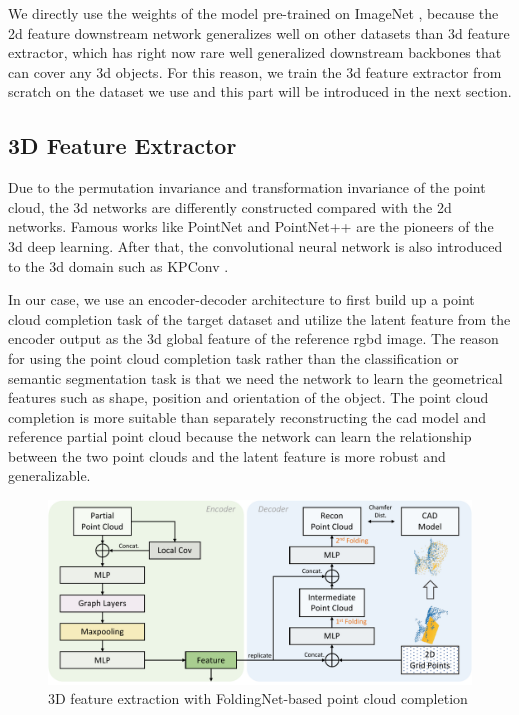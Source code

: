 \documentclass[12pt,DIV14,BCOR12mm,a4paper,footinclude=false,headinclude,parskip=half-,twoside,openright,cleardoublepage=empty,toc=index,bibliography=totoc,listof=totoc]{scrreprt}
\numberwithin{equation}{chapter}
\begin{document}
We directly use the weights of the model pre-trained on ImageNet \cite{5206848}, because the \gls{2d} feature downstream network generalizes well on other datasets than \gls{3d} feature extractor, which has right now rare well generalized downstream backbones that can cover any \gls{3d} objects. For this reason, we train the \gls{3d} feature extractor from scratch on the dataset we use and this part will be introduced in the next section.

\subsection{3D Feature Extractor}
Due to the permutation invariance and transformation invariance of the point cloud, the \gls{3d} networks are differently constructed compared with the \gls{2d} networks. Famous works like PointNet \cite{qi2017pointnet} and PointNet++ \cite{qi2017pointnet++} are the pioneers of the \gls{3d} deep learning. After that, the convolutional neural network is also introduced to the \gls{3d} domain such as KPConv \cite{thomas2019kpconv}. 

In our case, we use an encoder-decoder architecture to first build up a point cloud completion task of the target dataset and utilize the latent feature from the encoder output as the \gls{3d} global feature of the reference \gls{rgbd} image. The reason for using the point cloud completion task rather than the classification or semantic segmentation task is that we need the network to learn the geometrical features such as shape, position and orientation of the object. The point cloud completion is more suitable than separately reconstructing the \gls{cad} model and reference partial point cloud because the network can learn the relationship between the two point clouds and the latent feature is more robust and generalizable.
\begin{figure}[h]
	\centering
	\includegraphics[width=1.0\textwidth]{img/fold.pdf}
	\caption{3D feature extraction with FoldingNet-based point cloud completion}
	\label{img:fold}
\end{figure}
\end{document}
